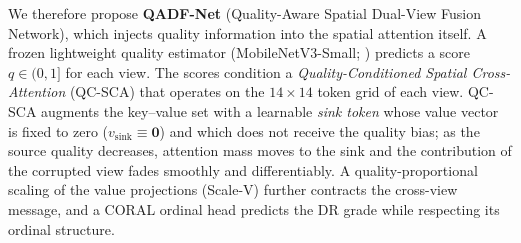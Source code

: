 \documentclass[final,5p,times,twocolumn,authoryear]{elsarticle}
\theoremstyle{plain}
\theoremstyle{remark}
\begin{document}
We therefore propose \textbf{QADF-Net} (Quality-Aware Spatial Dual-View Fusion Network), which injects quality information into the spatial attention itself. A frozen lightweight quality estimator (MobileNetV3-Small; \citealp{Howard2019mobilenetv3}) predicts a score $q\in(0,1]$ for each view. The scores condition a \emph{Quality-Conditioned Spatial Cross-Attention} (QC-SCA) that operates on the $14\times14$ token grid of each view. QC-SCA augments the key--value set with a learnable \emph{sink token} whose value vector is fixed to zero ($v_{\text{sink}}\equiv\mathbf{0}$) and which does not receive the quality bias; as the source quality decreases, attention mass moves to the sink and the contribution of the corrupted view fades smoothly and differentiably. A quality-proportional scaling of the value projections (Scale-V) further contracts the cross-view message, and a CORAL ordinal head \citep{Cao2020coral} predicts the DR grade while respecting its ordinal structure.
\end{document}
